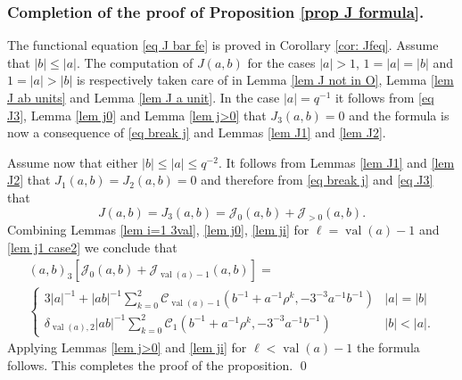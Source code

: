 \documentclass[12pt]{amsart}
\newcommand{\abs}[1]{\left|{#1}\right|}
\newcommand{\J}{\mathcal{J}}
\newcommand{\val}{{\operatorname{val}}}
\newcommand{\Cu}{\mathcal{C}}
\theoremstyle{remark}
\begin{document}
\subsubsection{Completion of the proof of Proposition \ref{prop J formula}.}
The functional equation \eqref{eq J bar fe} is proved in Corollary \ref{cor: Jfeq}. Assume that $\abs{b}\le \abs{a}$. The computation of $J(a,b)$ for the cases $\abs{a}>1$, $1=\abs{a}=\abs{b}$ and $1=\abs{a}>\abs{b}$ is respectively taken care of in Lemma \ref{lem J not in O}, Lemma \ref{lem J ab units} and Lemma \ref{lem J a unit}.
In the case $\abs{a}=q^{-1}$ it follows from \eqref{eq J3}, Lemma \ref{lem j0} and Lemma \ref{lem j>0} that $J_3(a,b)=0$ and the formula is now a consequence of \eqref{eq break j} and Lemmas \ref{lem J1} and \ref{lem J2}. 

Assume now that either $\abs{b}\le\abs{a}\le q^{-2}$.
It follows from Lemmas \ref{lem J1} and \ref{lem J2} that $J_1(a,b)=J_2(a,b)=0$ and therefore from \eqref{eq break j} and \eqref{eq J3} that 
\[
J(a,b)=J_3(a,b)=\J_0(a,b)+\J_{>0}(a,b).
\]
Combining Lemmas \ref{lem i=1 3val}, \ref{lem j0}, \ref{lem ji} for $\ell=\val(a)-1$ and \ref{lem j1 case2}  
we conclude that
\begin{multline}
(a,b)_3[\J_0(a,b)+\J_{\val(a)-1}(a,b)]=\\ \begin{cases} 3\abs{a}^{-1}+\abs{ab}^{-1}\sum_{k=0}^2\Cu_{\val(a)-1}(b^{-1}+a^{-1}\rho^k,-3^{-3}a^{-1}b^{-1}) & \abs{a}=\abs{b} \\ \delta_{\val(a),2} \abs{ab}^{-1}\sum_{k=0}^2\Cu_1(b^{-1}+a^{-1}\rho^k,-3^{-3}a^{-1}b^{-1}) & \abs{b}<\abs{a}.
\end{cases}
\end{multline}
Applying  Lemmas \ref{lem j>0} and \ref{lem ji} for $\ell<\val(a)-1$ the formula follows. This completes the proof of the proposition. \qed
\end{document}

